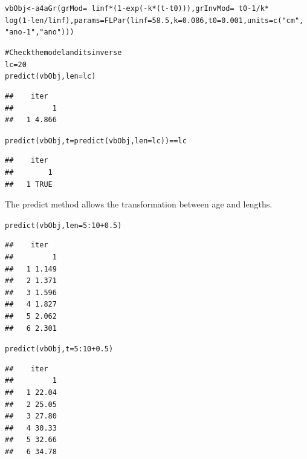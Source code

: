 \documentclass[a4paper,english,10pt]{article}\usepackage[]{graphicx}\usepackage[]{color}
\makeatletter
\newcommand{\hlnum}[1]{\textcolor[rgb]{0.2,0.2,0.2}{#1}}%
\newcommand{\hlstr}[1]{\textcolor[rgb]{0.2,0.2,0.2}{#1}}%
\newcommand{\hlcom}[1]{\textcolor[rgb]{0.2,0.267,0.4}{#1}}%
\newcommand{\hlopt}[1]{\textcolor[rgb]{0.2,0.2,0.2}{#1}}%
\newcommand{\hlstd}[1]{\textcolor[rgb]{0,0,0}{#1}}%
\newcommand{\hlkwb}[1]{\textcolor[rgb]{0.361,0.506,0.596}{#1}}%
\newcommand{\hlkwc}[1]{\textcolor[rgb]{0.361,0.506,0.596}{#1}}%
\newcommand{\hlkwd}[1]{\textcolor[rgb]{0.361,0.506,0.596}{#1}}%
\newenvironment{kframe}{%
 \def\at@end@of@kframe{}%
 \ifinner\ifhmode%
  \def\at@end@of@kframe{\end{minipage}}%
  \begin{minipage}{\columnwidth}%
 \fi\fi%
 \def\FrameCommand##1{\hskip\@totalleftmargin \hskip-\fboxsep
 \colorbox{shadecolor}{##1}\hskip-\fboxsep
     \hskip-\linewidth \hskip-\@totalleftmargin \hskip\columnwidth}%
 \MakeFramed {\advance\hsize-\width
   \@totalleftmargin\z@ \linewidth\hsize
   \@setminipage}}%
 {\par\unskip\endMakeFramed%
 \at@end@of@kframe}
\newenvironment{knitrout}{}{} %
\makeatother
\begin{document}
\begin{knitrout}
\color{fgcolor}\begin{kframe}
\begin{alltt}
\hlstd{vbObj} \hlkwb{<-} \hlkwd{a4aGr}\hlstd{(}\hlkwc{grMod} \hlstd{=} \hlopt{~}\hlstd{linf} \hlopt{*} \hlstd{(}\hlnum{1} \hlopt{-} \hlkwd{exp}\hlstd{(}\hlopt{-}\hlstd{k} \hlopt{*} \hlstd{(t} \hlopt{-} \hlstd{t0))),} \hlkwc{grInvMod} \hlstd{=} \hlopt{~}\hlstd{t0} \hlopt{-} \hlnum{1}\hlopt{/}\hlstd{k} \hlopt{*}
    \hlkwd{log}\hlstd{(}\hlnum{1} \hlopt{-} \hlstd{len}\hlopt{/}\hlstd{linf),} \hlkwc{params} \hlstd{=} \hlkwd{FLPar}\hlstd{(}\hlkwc{linf} \hlstd{=} \hlnum{58.5}\hlstd{,} \hlkwc{k} \hlstd{=} \hlnum{0.086}\hlstd{,} \hlkwc{t0} \hlstd{=} \hlnum{0.001}\hlstd{,} \hlkwc{units} \hlstd{=} \hlkwd{c}\hlstd{(}\hlstr{"cm"}\hlstd{,}
    \hlstr{"ano-1"}\hlstd{,} \hlstr{"ano"}\hlstd{)))}

\hlcom{# Check the model and its inverse}
\hlstd{lc} \hlkwb{=} \hlnum{20}
\hlkwd{predict}\hlstd{(vbObj,} \hlkwc{len} \hlstd{= lc)}
\end{alltt}
\begin{verbatim}
##    iter
##         1
##   1 4.866
\end{verbatim}
\begin{alltt}
\hlkwd{predict}\hlstd{(vbObj,} \hlkwc{t} \hlstd{=} \hlkwd{predict}\hlstd{(vbObj,} \hlkwc{len} \hlstd{= lc))} \hlopt{==} \hlstd{lc}
\end{alltt}
\begin{verbatim}
##    iter
##        1
##   1 TRUE
\end{verbatim}
\end{kframe}
\end{knitrout}


The predict method allows the transformation between age and lengths.

\begin{knitrout}
\color{fgcolor}\begin{kframe}
\begin{alltt}
\hlkwd{predict}\hlstd{(vbObj,} \hlkwc{len} \hlstd{=} \hlnum{5}\hlopt{:}\hlnum{10} \hlopt{+} \hlnum{0.5}\hlstd{)}
\end{alltt}
\begin{verbatim}
##    iter
##         1
##   1 1.149
##   2 1.371
##   3 1.596
##   4 1.827
##   5 2.062
##   6 2.301
\end{verbatim}
\begin{alltt}
\hlkwd{predict}\hlstd{(vbObj,} \hlkwc{t} \hlstd{=} \hlnum{5}\hlopt{:}\hlnum{10} \hlopt{+} \hlnum{0.5}\hlstd{)}
\end{alltt}
\begin{verbatim}
##    iter
##         1
##   1 22.04
##   2 25.05
##   3 27.80
##   4 30.33
##   5 32.66
##   6 34.78
\end{verbatim}
\end{kframe}
\end{knitrout}
\end{document}
